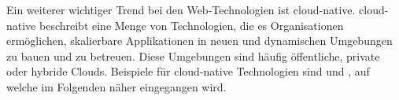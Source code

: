 Ein weiterer wichtiger Trend bei den Web-Technologien ist \Gls{cloud-native}. \Gls{cloud-native} beschreibt eine Menge von Technologien, die es Organisationen ermöglichen, skalierbare Applikationen in neuen und dynamischen Umgebungen zu bauen und zu betreuen. Diese Umgebungen sind häufig öffentliche, private oder hybride Clouds. Beispiele für \gls{cloud-native} Technologien sind  und , auf welche im Folgenden näher eingegangen wird.
